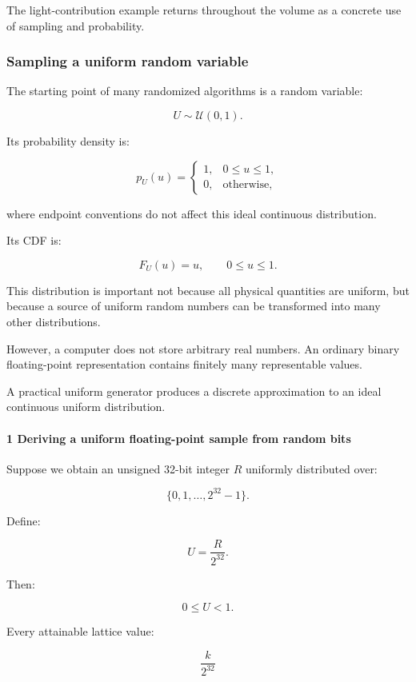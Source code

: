 The light-contribution example returns throughout the volume as a concrete use of sampling and probability.

\subsubsection{Sampling a uniform random variable}\label{sampling-a-uniform-random-variable}

The starting point of many randomized algorithms is a random variable:

\[
 U\sim\mathcal U(0,1).
\]

Its probability density is:

\[
 p_U(u)= \begin{cases} 1,&0\le u\le1,\\ 0,&\text{otherwise}, \end{cases}
\]

where endpoint conventions do not affect this ideal continuous distribution.

Its CDF is:

\[
 F_U(u)=u,\qquad 0\le u\le1.
\]

This distribution is important not because all physical quantities are uniform, but because a source of uniform random numbers can be transformed into many other distributions.

However, a computer does not store arbitrary real numbers. An ordinary binary floating-point representation contains finitely many representable values.

A practical uniform generator produces a discrete approximation to an ideal continuous uniform distribution.

\paragraph{1 Deriving a uniform floating-point sample from random bits}\label{deriving-a-uniform-floating-point-sample-from-random-bits}

Suppose we obtain an unsigned 32-bit integer \(R\) uniformly distributed over:

\[
 \{0,1,\ldots,2^{32}-1\}.
\]

Define:

\[
 \boxed{U=\frac{R}{2^{32}}}.
\]

Then:

\[
 0\le U<1.
\]

Every attainable lattice value:

\[
 \frac{k}{2^{32}}
\]


